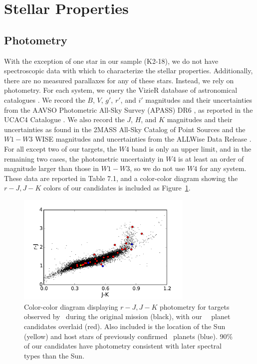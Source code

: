 \section{Stellar Properties}
\subsection{Photometry}

With the exception of one star in our sample (K2-18), we do not have
spectroscopic data with which to characterize the stellar properties.
Additionally, there are no measured parallaxes for any of these stars.
Instead, we rely on photometry.
For each system, we query the VizieR database of astronomical catalogues
\citep{Ochseinbein00}.
We record the $B$, $V$, $g'$, $r'$, and $i'$ magnitudes and their
uncertainties from the AAVSO Photometric All-Sky Survey (APASS) DR6
\citep{Henden14}, as reported in the UCAC4 Catalogue \citep{Zacharias12}.
We also record the $J$, $H$, and $K$ magnitudes and their uncertainties
as found in the 2MASS All-Sky Catalog of Point Sources \citep{Cutri03}
and the $W1-W3$ WISE magnitudes and uncertainties from the ALLWise Data
Release \citep{Cutri13}.
For all except two of our targets, the $W4$ band is only an upper limit,
and in the remaining two cases, the photometric uncertainty in $W4$ is at least an
order of magnitude larger than those in $W1-W3$, so we do not use $W4$
for any system.
These data are reported in Table 7.1, and a color-color diagram showing the
$r-J, J-K$ colors of our candidates is included as Figure~\ref{fig:photometry}.

\begin{figure}[htbp]
\centerline{\includegraphics[width=0.75\textwidth]{chapter7/f1.pdf}}
\caption[Color-color diagram showing \kep\ targets with our own \KT\ planet candidates overlaid.]
{Color-color diagram displaying $r-J, J-K$ photometry for targets
observed by \kep\ during the original
mission (black), with our \KT\ \Ci\ planet candidates overlaid (red).
Also included is the location of the Sun (yellow) and host stars of previously
confirmed \KT\ planets (blue).
90\% of our candidates have photometry consistent with later spectral
types than the Sun.}
\label{fig:photometry}
\end{figure}


